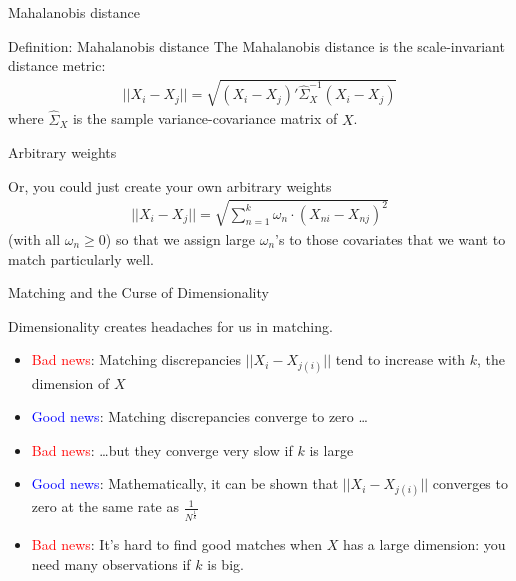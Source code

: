 \documentclass{beamer}
\begin{document}
\begin{frame}{Mahalanobis distance}
	
	\begin{block}{Definition: Mahalanobis distance}
	The Mahalanobis distance is the scale-invariant distance metric:
		\begin{eqnarray*}
		||X_i-X_j|| = \sqrt{ (X_i-X_j)'\widehat{\Sigma}_X^{-1}(X_i - X_j) }
		\end{eqnarray*}
	where $\widehat{\Sigma}_X$ is the sample variance-covariance matrix of $X$.
	\end{block}


\end{frame}


\begin{frame}{Arbitrary weights}
	
	Or, you could just create your own arbitrary weights
		\begin{eqnarray*}
		||X_i-X_j|| = \sqrt{ \sum_{n=1}^k \omega_n \cdot (X_{ni} - X_{nj})^2}
		\end{eqnarray*}(with all $\omega_n\geq{0}$) so that we assign large $\omega_n$'s to those covariates that we want to match particularly well.

\end{frame}

\begin{frame}{Matching and the Curse of Dimensionality}
	
Dimensionality creates headaches for us in matching.
	\begin{itemize}
	\item \textcolor{red}{Bad news}: Matching discrepancies $||X_i-X_{j(i)}||$ tend to increase with $k$, the dimension of $X$
	\item \textcolor{blue}{Good news}: Matching discrepancies converge to zero \dots
	\item \textcolor{red}{Bad news}: \dots but they converge very slow if $k$ is large
	\item \textcolor{blue}{Good news}: Mathematically, it can be shown that $||X_i-X_{j(i)}||$ converges to zero at the same rate as $\frac{1}{N^{\frac{1}{k}}}$
	\item \textcolor{red}{Bad news}: It's hard to find good matches when $X$ has a large dimension:  you need many observations if $k$ is big.
	\end{itemize}
\end{frame}
\end{document}
